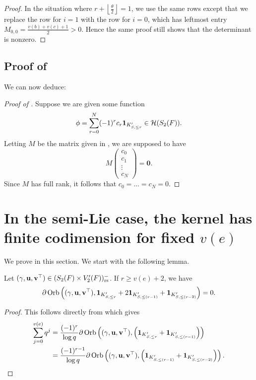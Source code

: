\begin{proof}
  In the situation where $r + \left\lfloor \frac{\theta}{2} \right\rfloor = 1$,
  we use the same rows except that we replace the row for $i=1$
  with the row for $i=0$, which has leftmost entry $M_{0,0} = \frac{v(b)+v(c)+1}{2} > 0$.
  Hence the same proof still shows that the determinant is nonzero.
\end{proof}

\subsection{Proof of }
We can now deduce:

\semiliekertriv*

\begin{proof}[Proof of ]
Suppose we are given some function
\[ \phi = \sum_{r=0}^N (-1)^r c_r \mathbf{1}_{K'_{S, \le r}} \in \mathcal H(S_2(F)). \]
Letting $M$ be the matrix given in ,
we are supposed to have
\[ M \begin{pmatrix} c_0 \\ c_1 \\ \vdots \\ c_N \end{pmatrix} = \mathbf{0}. \]
Since $M$ has full rank, it follows that $c_0 = \dots = c_N = 0$.
\end{proof}

\section{In the semi-Lie case, the kernel has finite codimension for fixed $v(e)$}
We prove  in this section.
We start with the following lemma.
\begin{lemma}
  \label{lem:semi_lie_large_r}
  Let ${(\gamma, \mathbf u, \mathbf v^\top)} \in (S_2(F) \times V'_2(F))_{\mathrm{rs}}^-$. If $r \ge v(e) + 2$, we have
  \[
    \partial \operatorname{Orb} \left( {(\gamma, \mathbf u, \mathbf v^\top)},
        \mathbf{1}_{K'_{S, \le r}} + 2 \mathbf{1}_{K'_{S, \le (r-1)}} + \mathbf{1}_{K'_{S, \le (r-2)}}
      \right) = 0.
  \]
\end{lemma}
\begin{proof}
  This follows directly from  which gives
  \begin{align*}
    \sum_{j=0}^{v(e)} q^j
    &= \frac{(-1)^r}{\log q} \partial
    \operatorname{Orb} \left( {(\gamma, \mathbf u, \mathbf v^\top)},
      \left(\mathbf{1}_{K'_{S, \le r}} + \mathbf{1}_{K'_{S, \le (r-1)}}\right)
      \right) \\
    &= \frac{(-1)^{r-1}}{\log q} \partial
    \operatorname{Orb} \left( {(\gamma, \mathbf u, \mathbf v^\top)},
      \left(\mathbf{1}_{K'_{S, \le (r-1)}} + \mathbf{1}_{K'_{S, \le (r-2)}}\right)
      \right). \qedhere
  \end{align*}
\end{proof}

